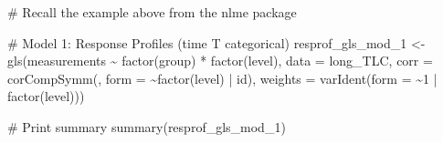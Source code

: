 \documentclass[
  letterpaper,
  DIV=11,
  numbers=noendperiod]{scrreprt}
\newenvironment{Shaded}{\begin{snugshade}}{\end{snugshade}}
\newcommand{\AttributeTok}[1]{\textcolor[rgb]{0.40,0.45,0.13}{#1}}
\newcommand{\CommentTok}[1]{\textcolor[rgb]{0.37,0.37,0.37}{#1}}
\newcommand{\DecValTok}[1]{\textcolor[rgb]{0.68,0.00,0.00}{#1}}
\newcommand{\FunctionTok}[1]{\textcolor[rgb]{0.28,0.35,0.67}{#1}}
\newcommand{\NormalTok}[1]{\textcolor[rgb]{0.00,0.23,0.31}{#1}}
\newcommand{\OtherTok}[1]{\textcolor[rgb]{0.00,0.23,0.31}{#1}}
\newcommand{\SpecialCharTok}[1]{\textcolor[rgb]{0.37,0.37,0.37}{#1}}
\begin{document}
\begin{Shaded}
\begin{Highlighting}[]
\CommentTok{\# Recall the example above from the nlme package}

\CommentTok{\# Model 1: Response Profiles (time T categorical)}
\NormalTok{resprof\_gls\_mod\_1 }\OtherTok{\textless{}{-}} \FunctionTok{gls}\NormalTok{(measurements }\SpecialCharTok{\textasciitilde{}} \FunctionTok{factor}\NormalTok{(group) }\SpecialCharTok{*} \FunctionTok{factor}\NormalTok{(level), }\AttributeTok{data =}\NormalTok{ long\_TLC,}
    \AttributeTok{corr =} \FunctionTok{corCompSymm}\NormalTok{(, }\AttributeTok{form =} \SpecialCharTok{\textasciitilde{}}\FunctionTok{factor}\NormalTok{(level) }\SpecialCharTok{|}\NormalTok{ id), }\AttributeTok{weights =} \FunctionTok{varIdent}\NormalTok{(}\AttributeTok{form =} \SpecialCharTok{\textasciitilde{}}\DecValTok{1} \SpecialCharTok{|}
        \FunctionTok{factor}\NormalTok{(level)))}

\CommentTok{\# Print summary}
\FunctionTok{summary}\NormalTok{(resprof\_gls\_mod\_1)}
\end{Highlighting}
\end{Shaded}
\end{document}
